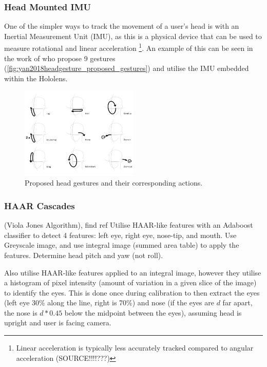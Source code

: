\subsubsection{Head Mounted IMU}
One of the simpler ways to track the movement of a user's head is with an Inertial Measurement Unit (IMU), as this is a physical device that can be used to measure rotational and linear acceleration \footnote{Linear acceleration is typically less accurately tracked compared to angular acceleration (SOURCE!!!!???)}.
An example of this can be seen in the work of \citeauthor{yan2018headgesture} who propose 9 gestures (\autoref{fig:yan2018headgesture_proposed_gestures}) and utilise the IMU embedded within the Hololens\cite{yan2018headgesture}.
\begin{figure}
    \centering
    \includegraphics[width=0.5\textwidth]{figures/yan2018headgesture_fig2_proposed_gestures.png}
    \caption{\label{fig:yan2018headgesture_proposed_gestures} Proposed head gestures and their corresponding actions\cite{yan2018headgesture}.}
\end{figure}

\subsubsection{HAAR Cascades}
(Viola Jones Algorithm), find ref
\cite{kim2017real} Utilise HAAR-like features with an Adaboost classifier to detect 4 features: left eye, right eye, nose-tip, and mouth.
Use Greyscale image, and use integral image (summed area table) to apply the features.
Determine head pitch and yaw (not roll).

\cite{neto2012real} Also utilise HAAR-like features applied to an integral image, however they utilise a histogram of pixel intensity (amount of variation in a given slice of the image) to identify the eyes.
This is done once during calibration to then extract the eyes (left eye 30\% along the line, right is 70\%) and nose (if the eyes are $d$ far apart, the nose is $d*0.45$ below the midpoint between the eyes), assuming head is upright and user is facing camera.

